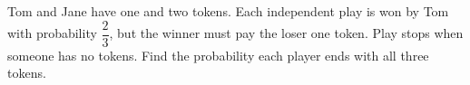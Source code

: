 Tom and Jane have one and two tokens. Each independent play is won by Tom with probability $\dfrac{2}{3}$, but the winner must pay the loser one token. Play stops when someone has no tokens. Find the probability each player ends with all three tokens.
